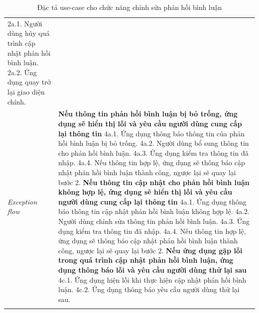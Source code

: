 \begin{center}
\begin{longtable}{
        |>{\raggedright\arraybackslash}p{3cm}
        |>{\raggedright\arraybackslash}p{13cm}
        |}
        2a.1. Người dùng hủy quá trình cập nhật phản hồi bình luận. \newline
        2a.2. Ứng dụng quay trở lại giao diện chính.
        \\\hdashline
        \rowcolor{cyan!10!white} \textit{Exception flow} & 
        \textbf{Nếu thông tin phản hồi bình luận bị bỏ trống, ứng dụng sẽ hiển thị lỗi và yêu cầu người dùng cung cấp lại thông tin} \newline
        4a.1. Ứng dụng thông báo thông tin của phản hồi bình luận bị bỏ trống. \newline
        4a.2. Người dùng bổ sung thông tin cho phản hồi bình luận. \newline
        4a.3. Ứng dụng kiểm tra thông tin đã nhập. \newline
        4a.4. Nếu thông tin hợp lệ, ứng dụng sẽ thông báo cập nhật phản hồi bình luận thành công, ngược lại sẽ quay lại bước 2. \newline
        \textbf{Nếu thông tin cập nhật cho phản hồi bình luận không hợp lệ, ứng dụng sẽ hiển thị lỗi và yêu cầu người dùng cung cấp lại thông tin} \newline
        4a.1. Ứng dụng thông báo thông tin cập nhật phản hồi bình luận không hợp lệ. \newline
        4a.2. Người dùng chỉnh sửa thông tin phản hồi bình luận. \newline
        4a.3. Ứng dụng kiểm tra thông tin đã nhập. \newline
        4a.4. Nếu thông tin hợp lệ, ứng dụng sẽ thông báo cập nhật phản hồi bình luận thành công, ngược lại sẽ quay lại bước 2. \newline
        \textbf{Nếu ứng dụng gặp lỗi trong quá trình cập nhật phản hồi bình luận, ứng dụng thông báo lỗi và yêu cầu người dùng thử lại sau} \newline
        4c.1. Ứng dụng hiện lỗi khi thực hiện cập nhật phản hồi bình luận. \newline
        4c.2. Ứng dụng thông báo yêu cầu người dùng thử lại sau.
        \\\hline
        \caption{Đặc tả use-case cho chức năng chỉnh sửa phản hồi bình luận}
    \end{longtable}
\end{center}

